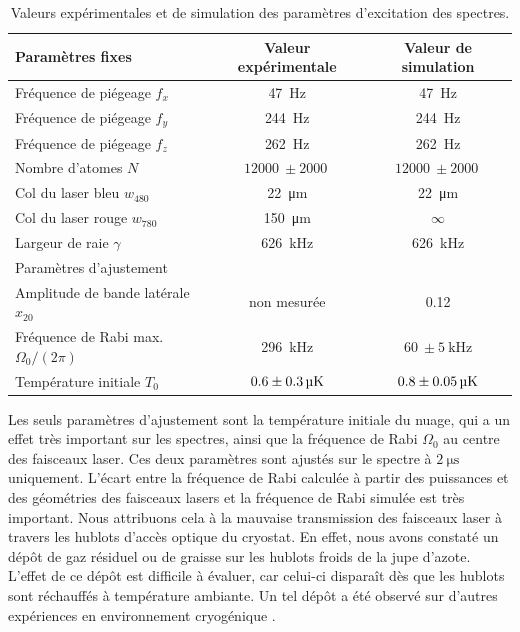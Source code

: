 \begin{table}[!h]
	\centering
	\caption[Paramètres de simulation]{Valeurs expérimentales et de simulation des paramètres d'excitation des spectres.
	}
	\label{tab:fit_sim_finalparam}
	\begin{tabular}{l c c}
		\toprule\midrule
		Paramètres fixes &	Valeur expérimentale & Valeur de simulation\\		
		\midrule
		Fréquence de piégeage $f_x$ & \SI{47}{\Hz} & \SI{47}{\Hz} \\
		Fréquence de piégeage $f_y$ & \SI{244}{\Hz} & \SI{244}{\Hz} \\
		Fréquence de piégeage $f_z$ & \SI{262}{\Hz} & \SI{262}{\Hz} \\
		Nombre d'atomes $N$ & $\SI{12000}{}\pm\SI{2000}{}$ & $\SI{12000}{}\pm\SI{2000}{}$ \\
		Col du laser bleu $w_{480}$ & \SI{22}{\um} & \SI{22}{\um} \\
		Col du laser rouge $w_{780}$ & \SI{150}{\um} & $\infty$ \\
		Largeur de raie $\gamma$ & \SI{626}{\kHz} & \SI{626}{\kHz}\\
		\midrule
		Paramètres d'ajustement & &\\\midrule
		Amplitude de bande latérale $x_{20}$ & non mesurée & \SI{0.12}{} \\
		Fréquence de Rabi max. $\Omega_0/(2\pi)$ & \SI{296}{\kHz} & $\SI{60}{} \pm \SI{5}{\kHz}$\\
		Température initiale $T_0$ & $\SI{0.6}{}\pm\SI{0.3}{\si{\micro\kelvin}}$ & $\SI{0.8}{}\pm\SI{0.05}{\si{\micro\kelvin}}$\\
		\midrule
		\bottomrule
 	\end{tabular}
\end{table}
%

Les seuls paramètres d'ajustement sont la température initiale du nuage, qui a un effet très important sur les spectres, ainsi que la fréquence de Rabi $\Omega_0$ au centre des faisceaux laser.
Ces deux paramètres sont ajustés sur le spectre à $\SI{2}{\us}$ uniquement.
L'écart entre la fréquence de Rabi calculée à partir des puissances et des géométries des faisceaux lasers et la fréquence de Rabi simulée est très important.
Nous attribuons cela à la mauvaise transmission des faisceaux laser à travers les hublots d'accès optique du cryostat.
En effet, nous avons constaté un dépôt de gaz résiduel ou de graisse sur les hublots froids de la jupe d'azote.
L'effet de ce dépôt est difficile à évaluer, car celui-ci disparaît dès que les hublots sont réchauffés à température ambiante.
Un tel dépôt a été observé sur d'autres expériences en environnement cryogénique \cite{PHD_LEUPOLD_ETHZ}.



